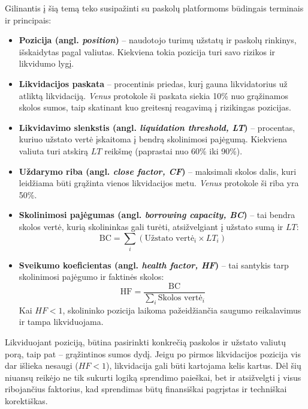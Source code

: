 \documentclass[]{VUMIFTemplateClass}
\begin{document}
Gilinantis į šią temą teko susipažinti su paskolų platformoms būdingais terminais ir principais:

\begin{itemize}
  \item \textbf{Pozicija (angl. \textit{position})} – naudotojo turimų užstatų ir paskolų rinkinys, išskaidytas pagal valiutas. Kiekviena tokia pozicija turi savo rizikos ir likvidumo lygį.
  
  \item \textbf{Likvidacijos paskata} – procentinis priedas, kurį gauna likvidatorius už atliktą likvidaciją. \textit{Venus} protokole ši paskata siekia 10\% nuo grąžinamos skolos sumos, taip skatinant kuo greitesnį reagavimą į rizikingas pozicijas.
  
  \item \textbf{Likvidavimo slenkstis (angl. \textit{liquidation threshold, LT})} – procentas, kuriuo užstato vertė įskaitoma į bendrą skolinimosi pajėgumą. Kiekviena valiuta turi atskirą $LT$ reikšmę (paprastai nuo 60\% iki 90\%).

  \item \textbf{Uždarymo riba (angl. \textit{close factor, CF})} – maksimali skolos dalis, kuri leidžiama būti grąžinta vienos likvidacijos metu. \textit{Venus} protokole ši riba yra 50\%.

  \item \textbf{Skolinimosi pajėgumas (angl. \textit{borrowing capacity, BC})} – tai bendra skolos vertė, kurią skolininkas gali turėti, atsižvelgiant į užstato sumą ir $LT$:
  \[
    \text{BC} = \sum_{i} \left( \text{Užstato vertė}_{i} \times LT_{i} \right)
  \]

  \item \textbf{Sveikumo koeficientas (angl. \textit{health factor, HF})} – tai santykis tarp skolinimosi pajėgumo ir faktinės skolos:
  \[
    \text{HF} = \frac{\text{BC}}{\sum_{i} \text{Skolos vertė}_{i}}
  \]
  Kai $HF < 1$, skolininko pozicija laikoma pažeidžiančia saugumo reikalavimus ir tampa likviduojama.
\end{itemize}

Likviduojant poziciją, būtina pasirinkti konkrečią paskolos ir užstato valiutų porą, taip pat – grąžintinos sumos dydį. Jeigu po pirmos likvidacijos pozicija vis dar išlieka nesaugi ($HF < 1$), likvidacija gali būti kartojama kelis kartus. Dėl šių niuansų reikėjo ne tik sukurti logiką sprendimo paieškai, bet ir atsižvelgti į visus ribojančius faktorius, kad sprendimas būtų finansiškai pagrįstas ir techniškai korektiškas.
\end{document}
